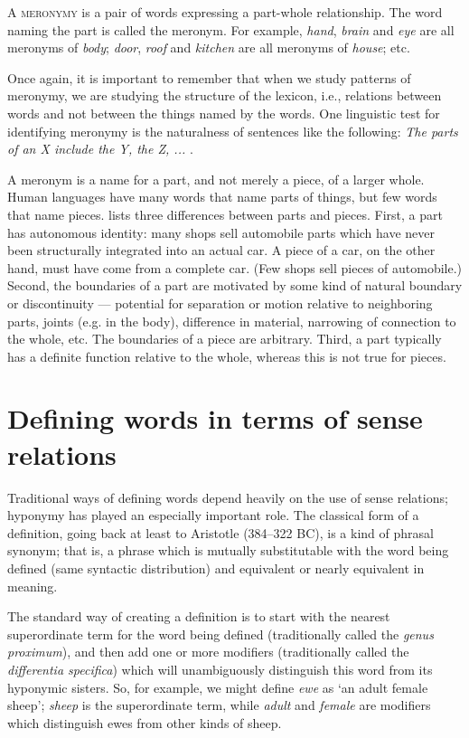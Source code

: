 A \textsc{meronymy} is a pair of words expressing a part-whole relationship. The word naming the part is called the meronym. For example, \textit{hand}, \textit{brain} and \textit{eye} are all meronyms of \textit{body}; \textit{door}, \textit{roof} and \textit{kitchen} are all meronyms of \textit{house}; etc.



Once again, it is important to remember that when we study patterns of meronymy, we are studying the structure of the lexicon, i.e., relations between words and not between the things named by the words. One linguistic test for identifying meronymy is the naturalness of sentences like the following: \textit{The parts of an X include the Y, the Z, ...} \citep[161]{Cruse1986}.



A meronym is a name for a part, and not merely a piece, of a larger whole. Human languages have many words that name parts of things, but few words that name pieces. \citet[158--159]{Cruse1986} lists three differences between parts and pieces. First, a part has autonomous identity: many shops sell automobile parts which have never been structurally integrated into an actual car. A piece of a car, on the other hand, must have come from a complete car. (Few shops sell pieces of automobile.) Second, the boundaries of a part are motivated by some kind of natural boundary or discontinuity — potential for separation or motion relative to neighboring parts, joints (e.g. in the body), difference in material, narrowing of connection to the whole, etc. The boundaries of a piece are arbitrary. Third, a part typically has a definite function relative to the whole, whereas this is not true for pieces.


\section{Defining words in terms of sense relations}\label{sec:6.3}

Traditional ways of defining words depend heavily on the use of sense relations; hyponymy has played an especially important role. The classical form of a definition, going back at least to Aristotle (384–322 BC), is a kind of phrasal synonym; that is, a phrase which is mutually substitutable with the word being defined (same syntactic distribution) and equivalent or nearly equivalent in meaning.



The standard way of creating a definition is to start with the nearest superordinate term for the word being defined (traditionally called the \textit{genus proximum}), and then add one or more modifiers (traditionally called the \textit{differentia specifica}) which will unambiguously distinguish this word from its hyponymic sisters. So, for example, we might define \textit{ewe} as ‘an adult female sheep’; \textit{sheep} is the superordinate term, while \textit{adult} and \textit{female} are modifiers which distinguish ewes from other kinds of sheep.



